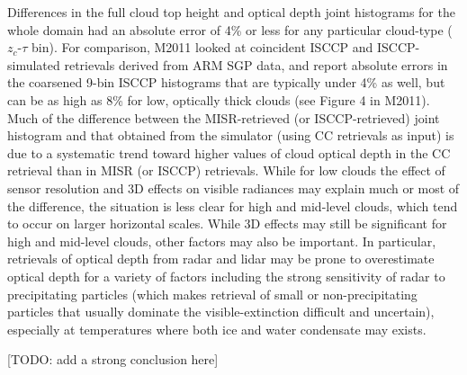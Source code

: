 Differences in the full cloud top height and optical depth joint
histograms for the whole domain had an absolute error of 4\% or less for
any particular cloud-type (\(z_c\)-\(\tau\) bin). For comparison, M2011
looked at coincident ISCCP and ISCCP-simulated retrievals derived from
ARM SGP data, and report absolute errors in the coarsened 9-bin ISCCP
histograms that are typically under 4\% as well, but can be as high as
8\% for low, optically thick clouds (see Figure 4 in M2011). Much of the
difference between the MISR-retrieved (or ISCCP-retrieved) joint
histogram and that obtained from the simulator (using CC retrievals as
input) is due to a systematic trend toward higher values of cloud
optical depth in the CC retrieval than in MISR (or ISCCP) retrievals.
While for low clouds the effect of sensor resolution and 3D effects on
visible radiances may explain much or most of the difference, the
situation is less clear for high and mid-level clouds, which tend to
occur on larger horizontal scales. While 3D effects may still be
significant for high and mid-level clouds, other factors may also be
important. In particular, retrievals of optical depth from radar and
lidar may be prone to overestimate optical depth for a variety of
factors including the strong sensitivity of radar to precipitating
particles (which makes retrieval of small or non-precipitating particles
that usually dominate the visible-extinction difficult and uncertain),
especially at temperatures where both ice and water condensate may
exists.

{[}TODO: add a strong conclusion here{]}
